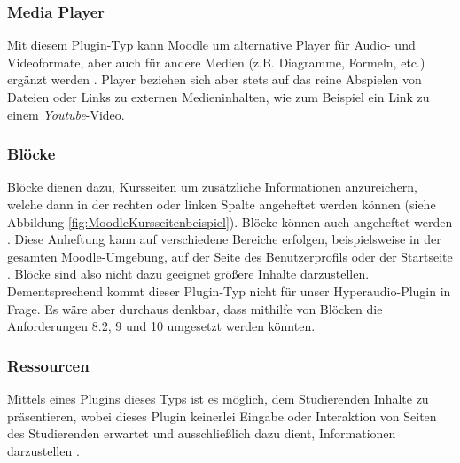 \subsubsection{Media Player}
Mit diesem Plugin-Typ kann Moodle um alternative Player für Audio- und Videoformate, aber auch für andere Medien (z.B. Diagramme, Formeln, etc.) ergänzt werden \citep{moodle2017media}. Player beziehen sich aber stets auf das reine Abspielen von Dateien oder Links zu externen Medieninhalten, wie zum Beispiel ein Link zu einem \textit{Youtube}-Video.


\subsubsection{Blöcke}
Blöcke dienen dazu, Kursseiten um zusätzliche Informationen anzureichern, welche dann in der rechten oder linken Spalte angeheftet werden können (siehe Abbildung \ref{fig:MoodleKursseitenbeispiel}). Blöcke können auch \glqq angeheftet\grqq{} werden \citep{moodle2018blocks}. Diese Anheftung kann auf verschiedene Bereiche erfolgen, beispielsweise in der gesamten Moodle-Umgebung, auf der Seite des Benutzerprofils oder der Startseite \citep{moodle2015blocksettings}. Blöcke sind also nicht dazu geeignet größere Inhalte darzustellen. Dementsprechend kommt dieser Plugin-Typ nicht für unser Hyperaudio-Plugin in Frage. Es wäre aber durchaus denkbar, dass mithilfe von Blöcken die Anforderungen 8.2, 9 und 10 umgesetzt werden könnten.  


\subsubsection{Ressourcen}
Mittels eines Plugins dieses Typs ist es möglich, dem Studierenden Inhalte zu präsentieren, wobei dieses Plugin keinerlei Eingabe oder Interaktion von Seiten des Studierenden erwartet und ausschließlich dazu dient, Informationen darzustellen \citep{wild2017moodle}.


